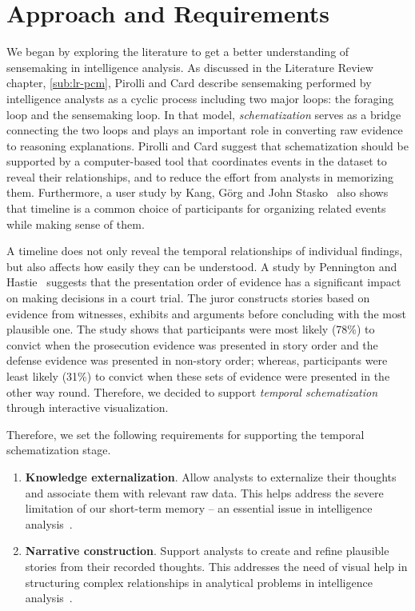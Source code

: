 \section{Approach and Requirements}
We began by exploring the literature to get a better understanding of sensemaking in intelligence analysis. As discussed in the Literature Review chapter, \autoref{sub:lr-pcm}, Pirolli and Card describe sensemaking performed by intelligence analysts as a cyclic process including two major loops: the foraging loop and the sensemaking loop. In that model, \emph{schematization} serves as a bridge connecting the two loops and plays an important role in converting raw evidence to reasoning explanations. Pirolli and Card suggest that schematization should be supported by a computer-based tool that coordinates events in the dataset to reveal their relationships, and to reduce the effort from analysts in memorizing them. Furthermore, a user study by Kang, Görg and John Stasko~\cite{Kang2011} also shows that timeline is a common choice of participants for organizing related events while making sense of them.

A timeline does not only reveal the temporal relationships of individual findings, but also affects how easily they can be understood. A study by Pennington and Hastie~\cite{Pennington1991} suggests that the presentation order of evidence has a significant impact on making decisions in a court trial. The juror constructs stories based on evidence from witnesses, exhibits and arguments before concluding with the most plausible one. The study shows that participants were most likely (78\%) to convict when the prosecution evidence was presented in story order and the defense evidence was presented in non-story order; whereas, participants were least likely (31\%) to convict when these sets of evidence were presented in the other way round. Therefore, we decided to support \emph{temporal schematization} through interactive visualization.

Therefore, we set the following requirements for supporting the temporal schematization stage.

\begin{enumerate}
	\item \textbf{Knowledge externalization}. Allow analysts to externalize their thoughts and associate them with relevant raw data. This helps address the severe limitation of our short-term memory -- an essential issue in intelligence analysis~\cite{Heuer1999}.
	\item \textbf{Narrative construction}. Support analysts to create and refine plausible stories from their recorded thoughts. This addresses the need of visual help in structuring complex relationships in analytical problems in intelligence analysis~\cite{Heuer1999}.
\end{enumerate}

